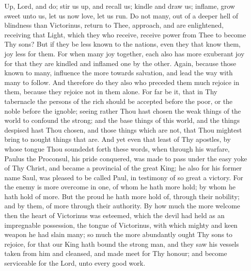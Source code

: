 \documentclass[b5paper,openright,12pt,twoside]{book}
\begin{document}
Up, Lord, and do; stir us up, and recall us; kindle and draw us;
inflame, grow sweet unto us, let us now love, let us run. Do not many,
out of a deeper hell of blindness than Victorinus, return to Thee,
approach, and are enlightened, receiving that Light, which they who
receive, receive power from Thee to become Thy sons? But if they be less
known to the nations, even they that know them, joy less for them. For
when many joy together, each also has more exuberant joy for that they
are kindled and inflamed one by the other. Again, because those known to
many, influence the more towards salvation, and lead the way with many
to follow. And therefore do they also who preceded them much rejoice in
them, because they rejoice not in them alone. For far be it, that in Thy
tabernacle the persons of the rich should be accepted before the poor,
or the noble before the ignoble; seeing rather Thou hast chosen the weak
things of the world to confound the strong; and the base things of this
world, and the things despised hast Thou chosen, and those things which
are not, that Thou mightest bring to nought things that are. And yet
even that least of Thy apostles, by whose tongue Thou soundedst forth
these words, when through his warfare, Paulus the Proconsul, his pride
conquered, was made to pass under the easy yoke of Thy Christ, and
became a provincial of the great King; he also for his former name Saul,
was pleased to be called Paul, in testimony of so great a victory. For
the enemy is more overcome in one, of whom he hath more hold; by whom
he hath hold of more. But the proud he hath more hold of, through their
nobility; and by them, of more through their authority. By how much the
more welcome then the heart of Victorinus was esteemed, which the devil
had held as an impregnable possession, the tongue of Victorinus,
with which mighty and keen weapon he had slain many; so much the more
abundantly ought Thy sons to rejoice, for that our King hath bound the
strong man, and they saw his vessels taken from him and cleansed, and
made meet for Thy honour; and become serviceable for the Lord, unto
every good work.
\end{document}
